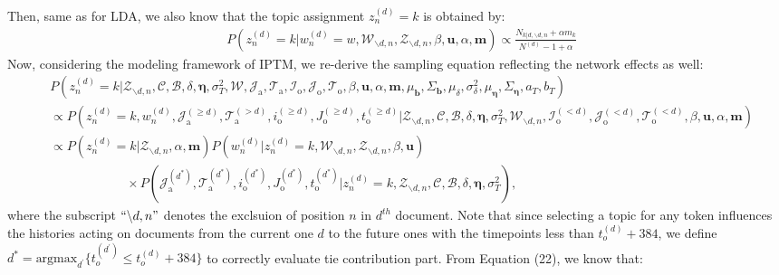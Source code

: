      Then, same as for LDA, we also know that the topic assignment $z_n^{(d)}=k$ is obtained by:
     \begin{equation*}
     \begin{aligned}
     &P(z^{(d)}_n=k|w^{(d)}_n=w, \mathcal{W}_{\backslash d, n}, \mathcal{Z}_{\backslash d,n}, \beta, \boldsymbol{u}, \alpha, \boldsymbol{m}) \propto
     \frac{N_{k|d, \backslash d, n}+\alpha m_k}{N^{(d)}-1+\alpha}
     \end{aligned}
     \end{equation*}
     Now, considering the modeling framework of IPTM, we re-derive the sampling equation reflecting the network effects as well:
   \begin{equation}
   \begin{aligned} & 
   P(z^{(d)}_n=k|\mathcal{Z}_{\backslash d, n},   \mathcal{C},   \mathcal{B}, \delta, \boldsymbol{\eta}, \sigma_T^2, \mathcal{W},  \mathcal{J}_{\mbox{a}}, \mathcal{T}_{\mbox{a}}, \mathcal{I}_{\mbox{o}}, \mathcal{J}_{\mbox{o}}, \mathcal{T}_{\mbox{o}}, \beta, \boldsymbol{u}, \alpha, \boldsymbol{m},  \mu_{\boldsymbol{b}}, \Sigma_{\boldsymbol{b}}, \mu_\delta, \sigma^2_\delta,\mu_{\boldsymbol{\eta}}, \Sigma_{\boldsymbol{\eta}}, a_T, b_T)\\
   & \propto P(z^{(d)}_n=k, w^{(d)}_n, \mathcal{J}^{(\geq d)}_{\mbox{a}}, \mathcal{T}^{(>d)}_{\mbox{a}}, i^{(\geq d)}_{\mbox{o}}, J^{(\geq d)}_{\mbox{o}}, t^{(\geq d)}_{\mbox{o}}|\mathcal{Z}_{\backslash d, n}, \mathcal{C},   \mathcal{B},\delta,\boldsymbol{\eta}, \sigma_T^2,\mathcal{W}_{\backslash d, n}, \mathcal{I}^{(<d)}_{\mbox{o}}, \mathcal{J}^{(<d)}_{\mbox{o}}, \mathcal{T}^{(<d)}_{\mbox{o}}, \beta, \boldsymbol{u}, \alpha, \boldsymbol{m})\\
   &\propto P(z^{(d)}_n=k|\mathcal{Z}_{\backslash d, n}, \alpha, \boldsymbol{m})P(w^{(d)}_n|z^{(d)}_n=k, \mathcal{W}_{\backslash d, n}, \mathcal{Z}_{\backslash d, n}, \beta, \boldsymbol{u} )\\&\quad\quad\quad\quad\quad\quad\times P(\mathcal{J}^{(d ^*)}_{\mbox{a}}, \mathcal{T}^{(d^*)}_{\mbox{a}}, i^{(d^*)}_{\mbox{o}}, J^{(d^*)}_{\mbox{o}}, t^{(d^*)}_{\mbox{o}}| z^{(d)}_n=k, \mathcal{Z}_{\backslash d, n}, \mathcal{C}, \mathcal{B}, \delta, 
  \boldsymbol{\eta}, \sigma_T^2),
   \end{aligned}
   \end{equation}
   where the subscript $``{\backslash d, n}"$ denotes the exclsuion of position $n$ in $d^{th}$ document. Note that since selecting a topic for any token influences the histories acting on documents from the current one $d$ to the future ones with the timepoints less than $t_o^{(d)}+384$, we define $d^*=\mbox{argmax}_{d^\prime} \{t_o^{(d^\prime)} \leq t_o^{(d)}+384\}$ to correctly evaluate tie contribution part. From Equation (22), we know that:
